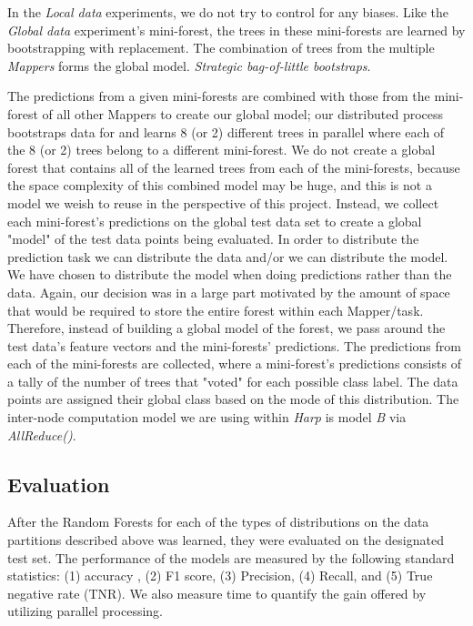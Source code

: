 \documentclass{sig-alternate-05-2015}
\begin{document}
In the \textit{Local data} experiments, we do not try to control for any biases.  Like the \textit{Global data} experiment's mini-forest, the trees in these mini-forests are learned by bootstrapping with replacement. The combination of trees from the multiple \textit{Mappers} forms the global model.
\textit{Strategic bag-of-little bootstraps}.

The predictions from a given mini-forests are combined with those from the mini-forest of all other Mappers to create our global model; our distributed process bootstraps data for and learns 8 (or 2) different trees in parallel where each of the 8 (or 2) trees belong to a different mini-forest. We do not create a global forest that contains all of the learned trees from each of the mini-forests, because the space complexity of this combined model may be huge, and this is not a model we weish to reuse in the perspective of this project. Instead, we collect each mini-forest's predictions on the global test data set to create a global "model" of the test data points being evaluated. In order to distribute the prediction task we can distribute the data and/or we can distribute the model. We have chosen to distribute the model when doing predictions rather than the data. Again, our decision was in a large part motivated by the amount of space that would be required to store the entire forest within each Mapper/task. Therefore, instead of building a global model of the forest, we pass around the test data's feature vectors and the mini-forests' predictions. The predictions from each of the mini-forests are collected, where a mini-forest's predictions consists of a tally of the number of trees that "voted" for each possible class label. The data points are assigned their global class based on the mode of this distribution. The inter-node computation model we are using within \textit{Harp} is model \textit{B} via \textit{AllReduce()}. 

\subsection{Evaluation}
After the Random Forests for each of the types of distributions on the data partitions described above was learned, they were evaluated on the designated test set. The performance of the models are measured by the following standard statistics: (1) accuracy , (2) F1 score, (3) Precision, (4) Recall, and (5) True negative rate (TNR). We also measure time to quantify the gain offered by utilizing parallel processing. 
\end{document}
